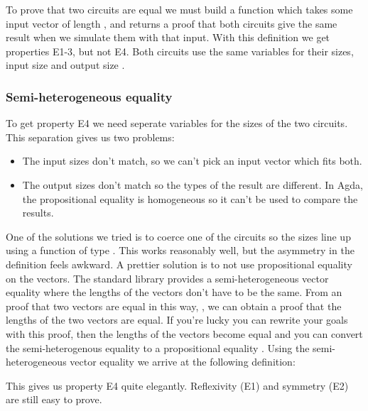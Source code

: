 
To prove that two circuits are equal we must build a function which
takes some input vector  of length , and returns a
proof that both circuits give the same result when we simulate them with
that input. With this definition we get properties E1-3, but not E4.
Both circuits use the same variables for their sizes, input size
 and output size .

\subsubsection{Semi-heterogeneous
equality}\label{semi-heterogeneous-equality}

To get property E4 we need seperate variables for the sizes of the two
circuits. This separation gives us two problems:

\begin{itemize}
\item
  The input sizes don't match, so we can't pick an input vector which
  fits both.
\item
  The output sizes don't match so the types of the result are different.
  In Agda, the propositional equality  is homogeneous so it
  can't be used to compare the results.
\end{itemize}

One of the solutions we tried is to coerce one of the circuits so the
sizes line up using a function of type  \AY{\{} 
 \AY{\}}      
        
.
This works reasonably well, but the asymmetry in the definition feels
awkward.
A prettier solution is to not use propositional equality on the
vectors.
The standard library provides a semi-heterogeneous vector
equality  where the lengths of the vectors don't have to be
the same. From an proof that two vectors are equal in this way,
  , we can obtain a proof that the lengths of the two
vectors are equal.
If you're lucky you can rewrite your goals with this proof, then the
lengths of the vectors become equal and you can convert the
semi-heterogenous equality to a propositional equality  
.
Using the semi-heterogeneous vector equality we arrive at the
following definition:


This gives us property E4 quite elegantly.
Reflexivity (E1) and symmetry (E2) are still easy to prove.

